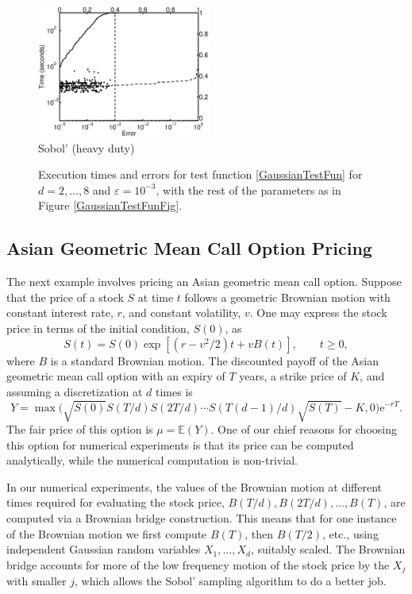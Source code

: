\documentclass[graybox]{svmult}
\newcommand{\me}{\ensuremath{\mathrm{e}}} %
\newcommand\e{\mathbb{E}}
\begin{document}
\begin{figure}
\begin{minipage}{5.7cm} \centering \includegraphics[width=5.7cm]{gaussiand=6SobolheavyErrTime.eps} \\ Sobol' (heavy duty) \end{minipage}
\caption{Execution times and errors for test function \eqref{GaussianTestFun} for $d=2, \ldots, 8$ and $\varepsilon=10^{-3}$, with the rest of the parameters as in Figure \ref{GaussianTestFunFig}.\label{GaussianTestFunHDFig}}
\end{figure}

\subsection{Asian Geometric Mean Call Option Pricing}

The next example involves pricing an Asian geometric mean call option.  Suppose that the price of a stock $S$ at time $t$ follows a geometric Brownian motion with constant interest rate, $r$, and constant volatility, $v$.  
One may express the stock price in terms of the initial condition, $S(0)$, as 
\[
S(t)=S(0) \exp[(r-v^2/2)t + v B(t)], \qquad t \ge 0,
\]
where $B$ is a standard Brownian motion.  
The discounted payoff of the Asian geometric mean call option with an expiry of $T$ years, a strike price of $K$, and assuming a discretization at $d$ times is 
\begin{equation} \label{payoff}
Y=\max\biggl(\sqrt{S(0)}S(T/d) S(2T/d)\cdots S(T(d-1)/d) \sqrt{S(T)} - K,0 \biggr)\me^{-rT}.
\end{equation}
The fair price of this option is $\mu=\e(Y)$. One of our chief reasons for choosing this option for numerical experiments is that its price can be computed analytically, while the numerical computation is non-trivial.

In our numerical experiments, the values of the Brownian motion at different times required for evaluating the stock price, $B(T/d), B(2T/d), \ldots,  B(T)$, are computed via a  Brownian bridge construction.  This means that for one instance of the Brownian motion we first compute $B(T)$, then $B(T/2)$, etc., using independent Gaussian random variables $X_1, \ldots, X_d$, suitably scaled. The Brownian bridge accounts for more of the low frequency motion of the stock price by the $X_j$ with smaller $j$, which allows the Sobol' sampling algorithm to do a better job.  
\end{document}
